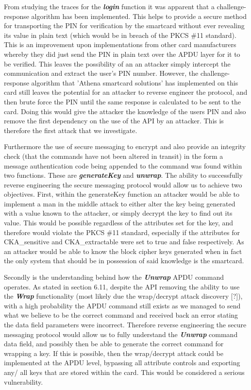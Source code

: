 \documentclass[bsc,frontabs,twoside,singlespacing,parskip,deptreport]{infthesis}     %
\begin{document}
From studying the traces for the \textbf{\textit{login}} function it was apparent that a challenge-response algorithm has been implemented. This helps to provide a secure method for transporting the PIN for verification by the smartcard without ever revealing its value in plain text (which would be in breach of the PKCS \#11 standard). This is an improvement upon implementations from other card manufacturers whereby they did just send the PIN in plain text over the APDU layer for it to be verified. This leaves the possibility of an an attacker simply intercept the communication and extract the user's PIN number. However, the challenge-response algorithm that 'Athena smartcard solutions' has implemented on this card still leaves the potential for an attacker to reverse engineer the protocol, and then brute force the PIN until the same response is calculated to be sent to the card. Doing this would give the attacker the knowledge of the users PIN and also remove the first dependency on the use of the API by an attacker. This is therefore the first attack that we investigate.

Furthermore the use of secure messaging to encrypt and also provide an integrity check (that the commands have not been altered in transit) in the form a message authentication code being appended to the command was found within two functions. These are \textbf{\textit{generateKey}} and \textbf{\textit{unwrap}}. The ability to successfully reverse engineering the secure messaging protocol would allow us to achieve two objectives. First, within the generateKey function an attacker would be able to implement a man in the middle attack to either alter the key being generated with a value known to the attacker, or simply decrypt the key to find out its value. This would be possible regardless of the attributes set for the key, and therefore would violate the PKCS \#11 standard, especially if the attributes for CKA\_sensitive and CKA\_extractable were set to true and false respectively. As an attacker would be able to know the block cipher keys generated when in fact the only system that should be in possession of said knowledge is the smartcard.

Secondly is the understanding behind how the \textbf{\textit{Unwrap}} APDU command operates. As stated in section 6.11, despite the API removing the ability to use the \textbf{\textit{Wrap}} functionality (most likely due the wrap/decrypt attack discovery [?]), with a high probability the APDU command still exists as we managed to send what we believe to be the correct command and received back an error stating the data field parameters were incorrect. Therefore reverse engineering the secure messaging protocol would allow us to fully understand the \textbf{\textit{Unwrap}} command data field, and possibly then be able to generate the correct command for wrapping a key. If this is possible, then the wrap/decrypt attack could be implemented at the APDU level, bypassing all attribute controls and exporting any/ all keys that are stored within the card. This would be considered a serious vulnerability.
\end{document}
